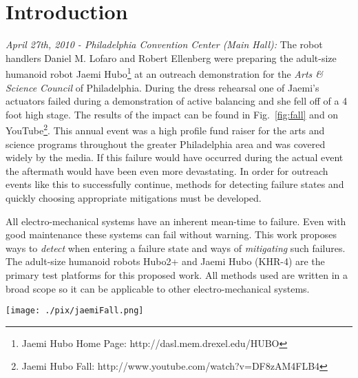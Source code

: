 \section{Introduction}

\textit{April 27th, 2010 - Philadelphia Convention Center (Main Hall):}  The robot handlers Daniel M. Lofaro 
and Robert Ellenberg were preparing the adult-size humanoid robot Jaemi Hubo\footnote{Jaemi Hubo Home Page: http://dasl.mem.drexel.edu/HUBO} at an outreach demonstration for the 
\textit{Arts \& Science Council} of Philadelphia.  During the dress rehearsal one of Jaemi's actuators failed 
during a demonstration of active balancing and she fell off of a 4 foot high stage.  The results of the impact 
can be found in Fig.~\ref{fig:fall} and on YouTube\footnote{Jaemi Hubo Fall: http://www.youtube.com/watch?v=DF8zAM4FLB4\label{link:fall}}.  
This annual event was a high profile fund raiser for the arts and science programs throughout the greater Philadelphia area and was covered widely by the media.  If this failure would have occurred during the actual event the 
aftermath would have been even more devastating.  In order for outreach events like this to successfully continue, methods 
for detecting failure states and quickly choosing appropriate mitigations must be developed.

All electro-mechanical systems have an inherent mean-time to failure.  Even with good maintenance these systems can fail without warning.  This work proposes ways to \textit{detect} when entering a failure state and ways of \textit{mitigating} such failures.  The adult-size humanoid robots Hubo2+ and Jaemi Hubo (KHR-4) are the primary test platforms for this proposed work.  All methods used are written in a broad scope so it can be applicable to other electro-mechanical systems.

\begin{figure*}[t]
  \centering
\texttt{[image: ./pix/jaemiFall.png]}
  \caption{Aftermath of the 4 foot fall Jaemi Hubo took after one of her actuators failed during operation.  A video with more images of the aftermath of the failure and further explanation of the event can be seen on YouTube.}%
  \label{fig:fall}
\end{figure*}  

